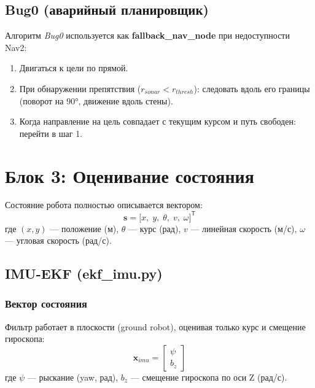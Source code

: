 \documentclass[12pt, a4paper]{article}
\newcommand{\T}{\mathsf{T}}       %
\begin{document}
\subsection{Bug0 (аварийный планировщик)}
Алгоритм \textit{Bug0} используется как \textbf{fallback\_nav\_node} при недоступности Nav2:
\begin{enumerate}[noitemsep]
  \item Двигаться к цели по прямой.
  \item При обнаружении препятствия ($r_{sonar} < r_{thresh}$): следовать вдоль его границы (поворот на 90°, движение вдоль стены).
  \item Когда направление на цель совпадает с текущим курсом и путь свободен: перейти в шаг 1.
\end{enumerate}

\newpage
\section{Блок 3: Оценивание состояния}
\label{sec:estimation}

Состояние робота полностью описывается вектором:
\begin{equation}
  \mathbf{s} = \bigl[x,\; y,\; \theta,\; v,\; \omega\bigr]^\T
\end{equation}
где $(x,y)$ — положение (м), $\theta$ — курс (рад), $v$ — линейная скорость (м/с), $\omega$ — угловая скорость (рад/с).

\subsection{IMU-EKF (ekf\_imu.py)}
\label{sec:ekf_imu}

\subsubsection{Вектор состояния}
Фильтр работает в плоскости (ground robot), оценивая только курс и смещение гироскопа:
\begin{equation}
  \mathbf{x}_{imu} = \begin{bmatrix} \psi \\ b_z \end{bmatrix}
\end{equation}
где $\psi$ — рыскание (yaw, рад), $b_z$ — смещение гироскопа по оси Z (рад/с).
\end{document}

